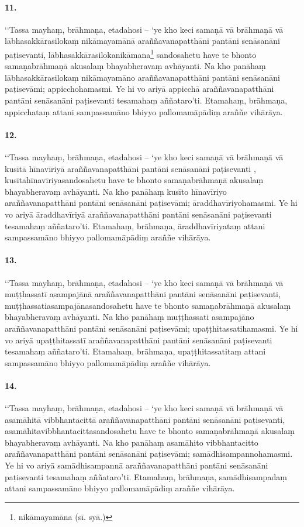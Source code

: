 \paragraph{11.} ‘‘Tassa mayhaṃ, brāhmaṇa, etadahosi – ‘ye kho keci samaṇā vā brāhmaṇā vā lābhasakkārasilokaṃ nikāmayamānā araññavanapatthāni pantāni senāsanāni paṭisevanti, lābhasakkārasilokanikāmana\footnote{nikāmayamāna (sī. syā.)} sandosahetu have te bhonto samaṇabrāhmaṇā akusalaṃ bhayabheravaṃ avhāyanti. Na kho panāhaṃ lābhasakkārasilokaṃ nikāmayamāno araññavanapatthāni pantāni senāsanāni paṭisevāmi; appicchohamasmi. Ye hi vo ariyā appicchā araññavanapatthāni pantāni senāsanāni paṭisevanti tesamahaṃ aññataro’ti. Etamahaṃ, brāhmaṇa, appicchataṃ attani sampassamāno bhiyyo pallomamāpādiṃ araññe vihārāya.

\paragraph{12.} ‘‘Tassa mayhaṃ, brāhmaṇa, etadahosi – ‘ye kho keci samaṇā vā brāhmaṇā vā kusītā hīnavīriyā araññavanapatthāni pantāni senāsanāni paṭisevanti , kusītahīnavīriyasandosahetu have te bhonto samaṇabrāhmaṇā akusalaṃ bhayabheravaṃ avhāyanti. Na kho panāhaṃ kusīto hīnavīriyo araññavanapatthāni pantāni senāsanāni paṭisevāmi; āraddhavīriyohamasmi. Ye hi vo ariyā āraddhavīriyā araññavanapatthāni pantāni senāsanāni paṭisevanti tesamahaṃ aññataro’ti. Etamahaṃ, brāhmaṇa, āraddhavīriyataṃ attani sampassamāno bhiyyo pallomamāpādiṃ araññe vihārāya.

\paragraph{13.} ‘‘Tassa mayhaṃ, brāhmaṇa, etadahosi – ‘ye kho keci samaṇā vā brāhmaṇā vā muṭṭhassatī asampajānā araññavanapatthāni pantāni senāsanāni paṭisevanti, muṭṭhassatiasampajānasandosahetu have te bhonto samaṇabrāhmaṇā akusalaṃ bhayabheravaṃ avhāyanti. Na kho panāhaṃ muṭṭhassati asampajāno araññavanapatthāni pantāni senāsanāni paṭisevāmi; upaṭṭhitassatihamasmi. Ye hi vo ariyā upaṭṭhitassatī araññavanapatthāni pantāni senāsanāni paṭisevanti tesamahaṃ aññataro’ti. Etamahaṃ, brāhmaṇa, upaṭṭhitassatitaṃ attani sampassamāno bhiyyo pallomamāpādiṃ araññe vihārāya.

\paragraph{14.} ‘‘Tassa mayhaṃ, brāhmaṇa, etadahosi – ‘ye kho keci samaṇā vā brāhmaṇā vā asamāhitā vibbhantacittā araññavanapatthāni pantāni senāsanāni paṭisevanti, asamāhitavibbhantacittasandosahetu have te bhonto samaṇabrāhmaṇā akusalaṃ bhayabheravaṃ avhāyanti. Na kho panāhaṃ asamāhito vibbhantacitto araññavanapatthāni pantāni senāsanāni paṭisevāmi; samādhisampannohamasmi. Ye hi vo ariyā samādhisampannā araññavanapatthāni pantāni senāsanāni paṭisevanti tesamahaṃ aññataro’ti. Etamahaṃ, brāhmaṇa, samādhisampadaṃ attani sampassamāno bhiyyo pallomamāpādiṃ araññe vihārāya.

